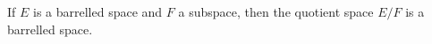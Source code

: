 If $E$ is a barrelled space and $F$ a subspace, then the quotient space $E/F$ is a barrelled space.
